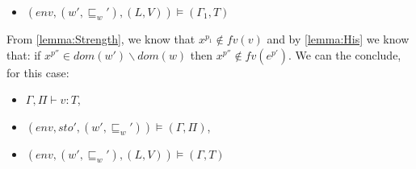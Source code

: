 \begin{description}
\begin{itemize}
			\item $(env,(w',\sqsubseteq_w'),(L,V))\models(\Gamma_1,T)$
		\end{itemize}
		From \cref{lemma:Strength}, we know that $x^{p_1}\notin fv(v)$ and by \cref{lemma:His} we know that: if $x^{p''}\in dom(w')\backslash dom(w)$ then $x^{p''}\notin fv(e^{p'})$.
		We can the conclude, for this case:
		\begin{itemize}
			\item $\Gamma,\Pi\vdash v:T$,
			\item $(env,sto',(w',\sqsubseteq_w'))\models(\Gamma,\Pi)$,
			\item $(env,(w',\sqsubseteq_w'),(L,V))\models(\Gamma,T)$
		\end{itemize}
\end{description}
